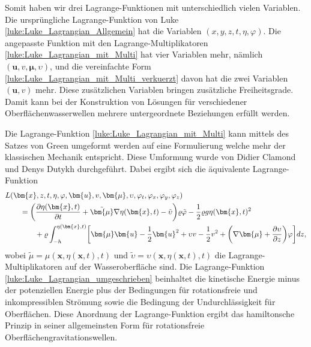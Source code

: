 Somit haben wir drei Lagrange-Funktionen mit unterschiedlich vielen Variablen.
Die ursprüngliche Lagrange-Funktion von Luke \eqref{luke:Luke_Lagrangian_Allgemein} hat die Variablen $(x,y,z,t,\eta,\varphi)$.
Die angepasste Funktion mit den Lagrange-Multiplikatoren
\eqref{luke:Luke_Lagrangian_mit_Multi} hat vier Variablen mehr,
nämlich
$(\bm{u},v,\bm{\mu},\upsilon)$, und die
vereinfachte Form \eqref{luke:Luke_Lagrangian_mit_Multi_verkuerzt} davon
hat die zwei Variablen $(\bm{u},v)$ mehr.
Diese zusätzlichen Variablen bringen zusätzliche Freiheitsgrade.
Damit kann bei der Konstruktion von Lösungen für verschiedener Oberflächenwasserwellen mehrere untergeordnete Beziehungen erfüllt werden.

Die Lagrange-Funktion \eqref{luke:Luke_Lagrangian_mit_Multi} kann mittels des Satzes von Green umgeformt werden auf eine Formulierung welche mehr der klassischen Mechanik entspricht.
%
%
Diese Umformung wurde von Didier Clamond und Denys Dutykh \cite{luke:CLAMOND201225} durchgeführt. Dabei ergibt sich die äquivalente Lagrange-Funktion
%
%
%
%
\begin{align}
&L(\bm{x},z,t,\eta,\varphi,\bm{u}, v, \bm{\mu},\upsilon,\varphi_t,\varphi_x,\varphi_y,\varphi_z)
\notag
\\
&\qquad=
\biggl(\frac{\partial \eta(\bm{x},t)}{\partial t}
+
\tilde{\bm{\mu}} \nabla \eta(\bm{x},t)
-
\tilde{\upsilon}\biggr) \varrho\tilde{\varphi}
-
\frac{1}{2} \varrho g \eta(\bm{x},t)^2
\notag
\\
&\qquad\qquad
+
\varrho
\int_{-h}^{\eta(\bm{x},t)}
\biggl[
\bm{\mu}  \bm{u} - \frac{1}{2} \bm{u}^2 + \upsilon v - \frac{1}{2} v^2
+ \biggl(\nabla \bm{\mu} + \frac{\partial \upsilon}{\partial z}\biggr)
\varphi
\biggr] dz,
	\label{luke:Luke_Lagrangian_umgeschrieben}
\end{align}
wobei $\tilde{\mu} = \mu(\bm{x},\eta(\bm{x},t),t)$ und $\tilde{\upsilon} = \upsilon(\bm{x},\eta(\bm{x},t),t)$ die Lagrange-Multiplikatoren auf der Wasseroberfläche sind.
Die Lagrange-Funktion \eqref{luke:Luke_Lagrangian_umgeschrieben} beinhaltet die kinetische Energie minus der potenziellen Energie plus der Bedingungen für rotationsfreie und inkompressiblen Strömung sowie die Bedingung der Undurchlässigkeit für Oberflächen.
%
%
%
%
Diese Anordnung der Lagrange-Funktion ergibt das hamiltonsche Prinzip in seiner allgemeinsten Form für rotationsfreie Oberflächengravitationswellen.

